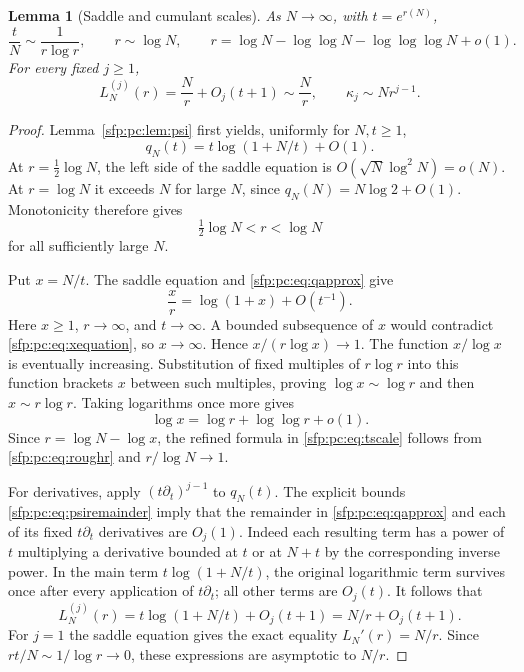 \documentclass[11pt,letterpaper]{article}
\numberwithin{equation}{section}
\newtheorem{lemma}[theorem]{Lemma}
\theoremstyle{definition}\newtheorem{definition}[theorem]{Definition}
\theoremstyle{remark}\newtheorem{remark}[theorem]{Remark}
\begin{document}
\begin{lemma}[Saddle and cumulant scales]\label{sfp:pc:lem:scales}
As $N\to\infty$, with $t=e^{r(N)}$,
\begin{equation}\label{sfp:pc:eq:tscale}
 \frac tN\sim\frac1{r\log r},\qquad
 r\sim\log N,\qquad
 r=\log N-\log\log N-\log\log\log N+o(1).
\end{equation}
For every fixed $j\geq1$,
\begin{equation}\label{sfp:pc:eq:Lderivatives}
 L_N^{(j)}(r)=\frac Nr+O_j(t+1)\sim\frac Nr,
 \qquad \kappa_j\sim Nr^{j-1}.
\end{equation}
\end{lemma}
\begin{proof}
Lemma~\ref{sfp:pc:lem:psi} first yields, uniformly for $N,t\geq1$,
\begin{equation}\label{sfp:pc:eq:qapprox}
 q_N(t)=t\log(1+N/t)+O(1).
\end{equation}
At $r=\tfrac12\log N$, the left side of the saddle equation is
$O(\sqrt N\log^2N)=o(N)$. At $r=\log N$ it exceeds $N$ for
large $N$, since $q_N(N)=N\log2+O(1)$. Monotonicity therefore
gives
\begin{equation}\label{sfp:pc:eq:roughr}
 \tfrac12\log N<r<\log N
\end{equation}
for all sufficiently large $N$.

Put $x=N/t$. The saddle equation and \eqref{sfp:pc:eq:qapprox} give
\begin{equation}\label{sfp:pc:eq:xequation}
 \frac xr=\log(1+x)+O(t^{-1}).
\end{equation}
Here $x\geq1$, $r\to\infty$, and $t\to\infty$.
A bounded subsequence of $x$ would contradict
\eqref{sfp:pc:eq:xequation}, so $x\to\infty$. Hence
$x/(r\log x)\to1$. The function $x/\log x$ is eventually
increasing. Substitution of fixed multiples of $r\log r$ into
this function brackets $x$ between such multiples, proving
$\log x\sim\log r$ and then $x\sim r\log r$.
Taking logarithms once more gives
\[
 \log x=\log r+\log\log r+o(1).
\]
Since $r=\log N-\log x$, the refined formula in
\eqref{sfp:pc:eq:tscale} follows from \eqref{sfp:pc:eq:roughr} and
$r/\log N\to1$.

For derivatives, apply $(t\partial_t)^{j-1}$ to $q_N(t)$.
The explicit bounds \eqref{sfp:pc:eq:psiremainder} imply that the
remainder in \eqref{sfp:pc:eq:qapprox} and each of its fixed
$t\partial_t$ derivatives are $O_j(1)$. Indeed each resulting
term has a power of $t$ multiplying a derivative bounded at
$t$ or at $N+t$ by the corresponding inverse power. In the main
term $t\log(1+N/t)$, the original logarithmic term survives
once after every application of $t\partial_t$; all other terms
are $O_j(t)$. It follows that
\[
 L_N^{(j)}(r)=t\log(1+N/t)+O_j(t+1)
           =N/r+O_j(t+1).
\]
For $j=1$ the saddle equation gives the exact equality
$L_N'(r)=N/r$. Since $rt/N\sim1/\log r\to0$, these expressions
are asymptotic to $N/r$.


\end{proof}
\end{document}
